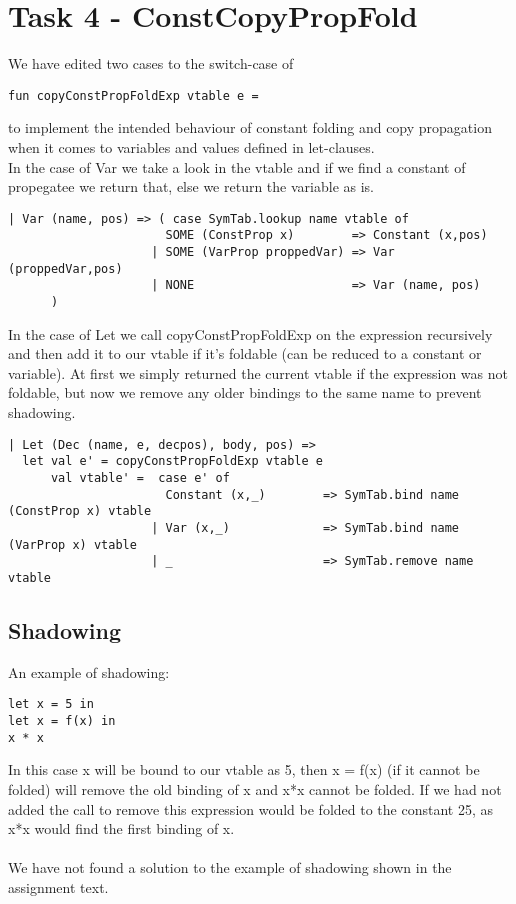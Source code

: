 \documentclass{article}
\begin{document}
\section{Task 4 - ConstCopyPropFold}
We have edited two cases to the switch-case of 
\begin{lstlisting}
fun copyConstPropFoldExp vtable e =
\end{lstlisting}
to implement the intended behaviour of constant folding and copy propagation when it comes to variables and values defined in let-clauses.\\
In the case of Var we take a look in the vtable and if we find a constant of propegatee we return that, else we return the variable as is.\\
\begin{lstlisting}
| Var (name, pos) => ( case SymTab.lookup name vtable of
                      SOME (ConstProp x)        => Constant (x,pos) 
                    | SOME (VarProp proppedVar) => Var (proppedVar,pos)
                    | NONE                      => Var (name, pos)
      )
\end{lstlisting}

\noindent In the case of Let we call copyConstPropFoldExp on the expression recursively and then add it to our vtable if it's foldable (can be reduced to a constant or variable). At first we simply returned the current vtable if the expression was not foldable, but now we remove any older bindings to the same name to prevent shadowing.

\begin{lstlisting}
| Let (Dec (name, e, decpos), body, pos) => 
  let val e' = copyConstPropFoldExp vtable e
      val vtable' =  case e' of
                      Constant (x,_)        => SymTab.bind name (ConstProp x) vtable 
                    | Var (x,_)             => SymTab.bind name (VarProp x) vtable
                    | _                     => SymTab.remove name vtable
\end{lstlisting}

\subsection{Shadowing}
\noindent An example of shadowing:

\begin{lstlisting}
let x = 5 in
let x = f(x) in
x * x
\end{lstlisting}

\noindent In this case x will be bound to our vtable as 5, then x = f(x) (if it cannot be folded) will remove the old binding of x and x*x cannot be folded. If we had not added the call to remove this expression would be folded to the constant 25, as x*x would find the first binding of x.\\
\\
We have not found a solution to the example of shadowing shown in the assignment text.
\end{document}

